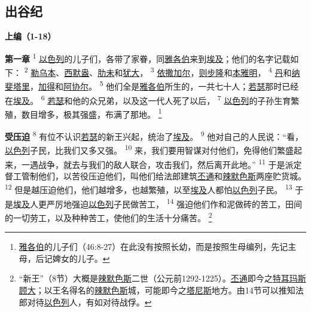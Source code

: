 \setlength\columnsep{0.6cm}
\begin{multicols}{2}

\chapter*{出谷纪}


\begin{center}
	\textbf{\large{\songti 上编（1-18）}}
\end{center}

\textbf{第一章\quad}
\textsuperscript{1}
\uline{以色列}的儿子们，各带了家眷，同\uline{雅各伯}来到\uline{埃及}；他们的名字记载如下：
\textsuperscript{2}
\uline{勒乌本}、\uline{西默盎}、\uline{肋未}和\uline{犹大}，
\textsuperscript{3}
\uline{依撒}\uline{加尔}，\uline{则步隆}和\uline{本雅明}，
\textsuperscript{4}
\uline{丹}和\uline{纳斐塔里}，\uline{加得}和\uline{阿协尔}。
\textsuperscript{5}
他们全是\uline{雅各伯}所生的，一共七十人；\uline{若瑟}那时已经在\uline{埃及}。
\textsuperscript{6}
\uline{若瑟}和他的众兄弟，以及这一代人死了以后，
\textsuperscript{7}
\uline{以色列}的子孙生育繁殖，数目增多，极其强盛，布满了那地。
\renewcommand\thefootnote{\ding{\numexpr171+\value{footnote}}}
\footnote{\uline{雅各伯}的儿子们（46:8-27）在此没有按照长幼，而是按照生母编列，先记主母，后记婢女的儿子。}

\textbf{受压迫\quad}
\textsuperscript{8}
有位不认识\uline{若瑟}的新王兴起，统治了\uline{埃及}。
\textsuperscript{9}
他对自己的人民说：“看，\uline{以色列}子民，比我们又多又强。
\textsuperscript{10}
来，我们要用智谋对付他们，免得他们繁盛起来，一遇战争，就去与我们的敌人联合，攻击我们，然后离开此地。”
\textsuperscript{11}
于是派定督工管制他们，以苦役压迫他们，叫他们给法郎建筑\uline{丕通}和\uline{辣默}\uline{色斯}两座贮货城。
\textsuperscript{12}
但是越压迫他们，他们越增多，也越繁殖，以至\uline{埃及}人都怕\uline{以色列}子民。
\textsuperscript{13}
于是\uline{埃及}人更严厉地强迫\uline{以色列}子民做苦工，
\textsuperscript{14}
强迫他们作和泥做砖的苦工，田间的一切劳工，以及种种苦工，使他们的生活十分痛苦。
\footnote{“新王”（8节）大概是\uline{辣默色斯}二世（公元前1292-1225）。\uline{丕通}即今之\uline{特耳玛斯}\uline{顾大}；以王名得名的\uline{辣默色斯}城，可能即今之\uline{塔尼斯}地方。由14节可以推知法郎对待\uline{以色列}人，有如对待战俘。}


\end{multicols}
